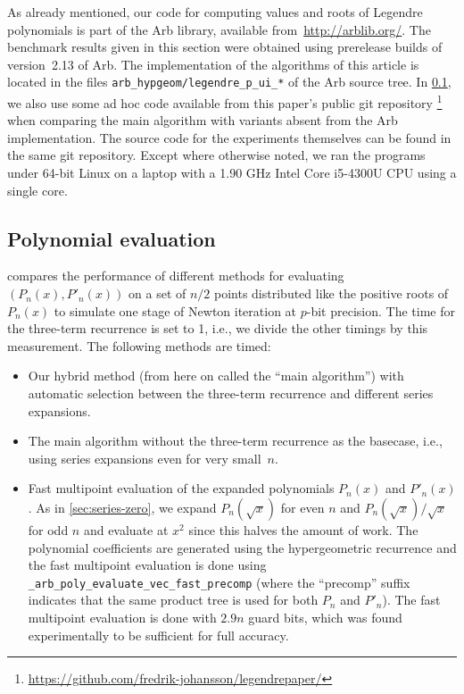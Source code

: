 \documentclass[nohypdvips,review]{siamart0216}
\begin{document}
As already mentioned, our code for computing values and roots of
Legendre polynomials is part of the Arb library, available
from~\url{http://arblib.org/}.
The benchmark results given in this section were obtained using
prerelease builds of
version~2.13 of Arb.
The implementation of the algorithms of this article is located in the
files \texttt{arb\_hypgeom/legendre\_p\_ui\_*} of the Arb source tree.
In \cref{sec:bench-variants}, we also use some ad hoc code available
from this paper's public git repository%
\footnote{\url{https://github.com/fredrik-johansson/legendrepaper/}}
when comparing the main algorithm with variants absent from the Arb
implementation.
The source code for the experiments themselves can be found in the same
git repository.
Except where otherwise noted, we ran the programs under 64-bit Linux on a
laptop with a
1.90 GHz Intel Core i5-4300U CPU using a single core.

\label{sec:bench}

\subsection{Polynomial evaluation}

\label{sec:bench-variants}

 compares the performance of different methods
for evaluating $(P_n(x), P'_n(x))$ on a set of $n/2$ points
distributed like the positive roots of $P_n(x)$
to simulate one stage of Newton iteration at $p$-bit precision.
The time for the three-term recurrence is set to 1, i.e., we divide
the other timings by this measurement.
The following methods are timed:

\begin{itemize}
\item Our hybrid method (from here on called the ``main algorithm'')
with automatic selection between the three-term
recurrence and different
series expansions.
\item The main algorithm without
the three-term recurrence as the basecase, i.e., using series expansions
even for very small~$n$.
\item Fast multipoint
evaluation of the expanded polynomials $P_n(x)$ and $P'_n(x)$.
As in \cref{sec:series-zero}, we expand
$P_{n}(\sqrt{x})$ for even $n$ and $P_{n}(\sqrt{x})/\sqrt{x}$ for odd $n$
and evaluate at $x^2$ since this halves the amount of work.
The polynomial coefficients are generated using
the hypergeometric recurrence and
the fast multipoint evaluation is done using
\texttt{\_arb\_poly\_evaluate\_vec\_fast\_precomp}
(where the ``precomp'' suffix indicates that
the same product tree is used for both $P_n$ and $P'_n$).
The fast multipoint evaluation is done with $2.9n$ guard bits,
which was found experimentally to be sufficient for full accuracy.
\end{itemize}
\end{document}
